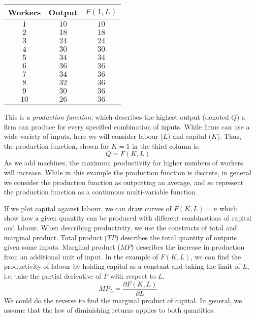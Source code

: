\documentclass[12pt]{report}
\begin{document}
\begin{center}    
    \begin{tabular}{c|c|c}
        Workers & Output & \(F(1, L)\) \\
        \hline
        \(1\) & \(10\) & \(10\) \\
        \(2\) & \(18\) & \(18\) \\
        \(3\) & \(24\) & \(24\) \\
        \(4\) & \(30\) & \(30\) \\
        \(5\) & \(34\) & \(34\) \\
        \(6\) & \(36\) & \(36\) \\
        \(7\) & \(34\) & \(36\) \\
        \(8\) & \(32\) & \(36\) \\
        \(9\) & \(30\) & \(36\) \\
        \(10\) & \(26\) & \(36\) \\  
    \end{tabular}
\end{center}

This is a \textit{production function}, which describes the highest output
(denoted \(Q\)) a firm can produce for every specified combination of inputs.
While firms can use a wide variety of inputs, here we will consider labour 
(\(L\)) and capital (\(K\)). Thus, the production function, shown for \(K = 1\)
in the third column is:
\[Q = F(K, L)\]
As we add machines, the maximum productivity for higher numbers of workers will
increase. While in this example the production function is discrete, in general
we consider the production function as outputting an average, and so represent 
the production function as a continuous multi-variable function.

\bigskip
If we plot capital against labour, we can draw curves of \(F(K, L) = n\) which
show how a given quantity can be produced with different combinations of 
capital and labour. When describing productivity, we use the constructs of 
total and marginal product. Total product (\(TP\)) describes the total quantity
of outputs given some inputs. Marginal product (\(MP\)) describes the increase
in production from an additional unit of input. In the example of \(F(K, L)\),
we can find the productivity of labour by holding capital as a constant and 
taking the limit of \(L\), i.e. take the partial derivative of \(F\) with 
respect to \(L\).
\[MP_L = \frac{\partial F(K, L)}{\partial L}\]
We could do the reverse to find the marginal product of capital. In general,
we assume that the law of diminishing returns applies to both quantities.
\end{document}
